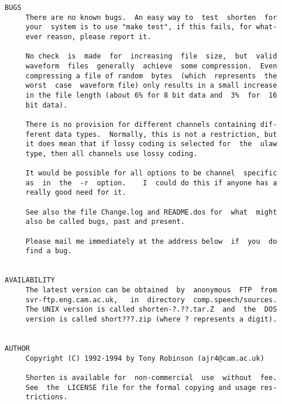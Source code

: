 \begin{verbatim}
BUGS
     There are no known bugs.  An easy way to  test  shorten  for
     your  system is to use "make test", if this fails, for what-
     ever reason, please report it.

     No check  is  made  for  increasing  file  size,  but  valid
     waveform  files  generally  achieve  some compression.  Even
     compressing a file of random  bytes  (which  represents  the
     worst  case  waveform file) only results in a small increase
     in the file length (about 6% for 8 bit data and  3%  for  16
     bit data).

     There is no provision for different channels containing dif-
     ferent data types.  Normally, this is not a restriction, but
     it does mean that if lossy coding is selected for  the  ulaw
     type, then all channels use lossy coding.

     It would be possible for all options to be channel  specific
     as  in  the  -r  option.    I  could do this if anyone has a
     really good need for it.

     See also the file Change.log and README.dos for  what  might
     also be called bugs, past and present.

     Please mail me immediately at the address below  if  you  do
     find a bug.


AVAILABILITY
     The latest version can be obtained  by  anonymous  FTP  from
     svr-ftp.eng.cam.ac.uk,   in  directory  comp.speech/sources.
     The UNIX version is called shorten-?.??.tar.Z  and  the  DOS
     version is called short???.zip (where ? represents a digit).


AUTHOR
     Copyright (C) 1992-1994 by Tony Robinson (ajr4@cam.ac.uk)

     Shorten is available for  non-commercial  use  without  fee.
     See  the  LICENSE file for the formal copying and usage res-
     trictions.
\end{verbatim}


\bye

